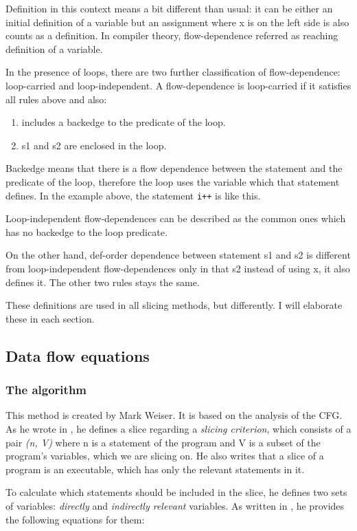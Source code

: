 \documentclass[oneside,12pt,a4paper]{book}
\begin{document}
Definition in this context means a bit different than usual: it can be either an initial definition of a variable but an assignment where x is on the left side is also counts as a definition. In compiler theory, flow-dependence referred as reaching definition of a variable.

In the presence of loops, there are two further classification of flow-dependence: loop-carried and loop-independent. A flow-dependence is loop-carried if it satisfies all rules above and also:
\begin{enumerate}
  \item includes a backedge to the predicate of the loop.
  \item s1 and s2 are enclosed in the loop.
\end{enumerate}

Backedge means that there is a flow dependence between the statement and the predicate of the loop, therefore the loop uses the variable which that statement defines. In the example above, the statement \texttt{i++} is like this.

Loop-independent flow-dependences can be described as the common ones which has no backedge to the loop predicate. 

On the other hand, def-order dependence between statement s1 and s2 is different from loop-independent flow-dependences only in that s2 instead of using x, it also defines it. The other two rules stays the same. 

These definitions are used in all slicing methods, but differently. I will elaborate these in each section.

\subsection{Data flow equations}
\subsubsection{The algorithm}
This method is created by Mark Weiser. It is based on the analysis of the CFG. As he wrote in \cite{weiser84}, he defines a slice regarding a \textit{slicing criterion}, which consists of a pair \textit{(n, V)} where n is a statement of the program and V is a subset of the program's variables, which we are slicing on. He also writes that a slice of a program is an executable, which has only the relevant statements in it.

To calculate which statements should be included in the slice, he defines two sets of variables: \textit{directly} and \textit{indirectly relevant} variables. As written in \cite{slicing-survey}, he provides the following equations for them:
\end{document}
